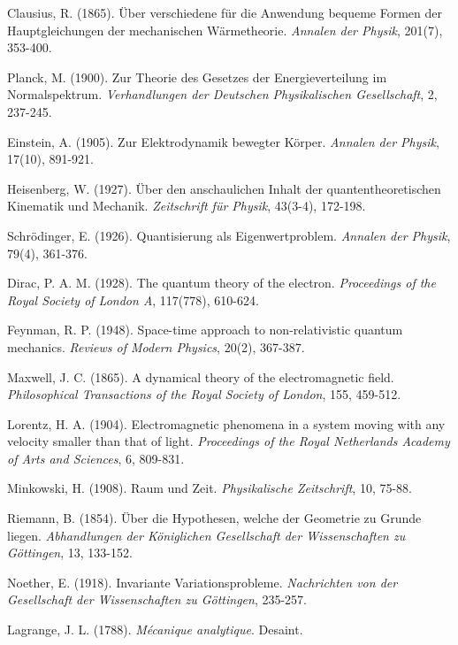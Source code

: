 \documentclass[12pt,a4paper]{article}
\begin{document}
\begin{thebibliography}{99}
Clausius, R. (1865). Über verschiedene für die Anwendung bequeme Formen der Hauptgleichungen der mechanischen Wärmetheorie. \textit{Annalen der Physik}, 201(7), 353-400.

Planck, M. (1900). Zur Theorie des Gesetzes der Energieverteilung im Normalspektrum. \textit{Verhandlungen der Deutschen Physikalischen Gesellschaft}, 2, 237-245.

Einstein, A. (1905). Zur Elektrodynamik bewegter Körper. \textit{Annalen der Physik}, 17(10), 891-921.

Heisenberg, W. (1927). Über den anschaulichen Inhalt der quantentheoretischen Kinematik und Mechanik. \textit{Zeitschrift für Physik}, 43(3-4), 172-198.

Schrödinger, E. (1926). Quantisierung als Eigenwertproblem. \textit{Annalen der Physik}, 79(4), 361-376.

Dirac, P. A. M. (1928). The quantum theory of the electron. \textit{Proceedings of the Royal Society of London A}, 117(778), 610-624.

Feynman, R. P. (1948). Space-time approach to non-relativistic quantum mechanics. \textit{Reviews of Modern Physics}, 20(2), 367-387.

Maxwell, J. C. (1865). A dynamical theory of the electromagnetic field. \textit{Philosophical Transactions of the Royal Society of London}, 155, 459-512.

Lorentz, H. A. (1904). Electromagnetic phenomena in a system moving with any velocity smaller than that of light. \textit{Proceedings of the Royal Netherlands Academy of Arts and Sciences}, 6, 809-831.

Minkowski, H. (1908). Raum und Zeit. \textit{Physikalische Zeitschrift}, 10, 75-88.

Riemann, B. (1854). Über die Hypothesen, welche der Geometrie zu Grunde liegen. \textit{Abhandlungen der Königlichen Gesellschaft der Wissenschaften zu Göttingen}, 13, 133-152.

Noether, E. (1918). Invariante Variationsprobleme. \textit{Nachrichten von der Gesellschaft der Wissenschaften zu Göttingen}, 235-257.

Lagrange, J. L. (1788). \textit{Mécanique analytique}. Desaint.


\end{thebibliography}
\end{document}
